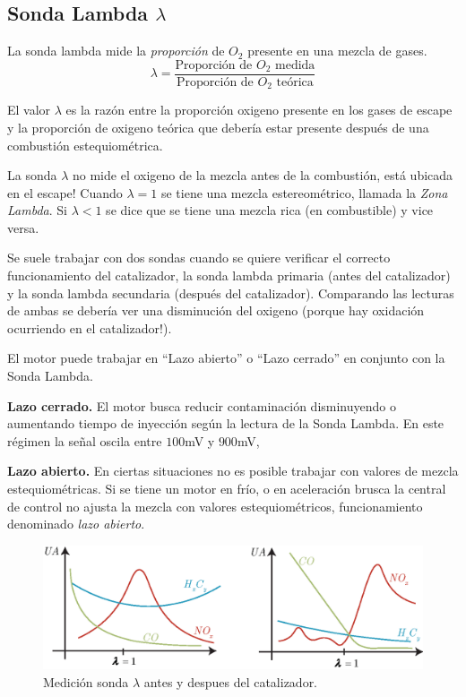 \subsection{Sonda Lambda $\lambda$}
La sonda lambda mide la \textit{proporción} de $O_2$ presente en una mezcla de gases.
\[
\lambda = \frac{\textrm{Proporción de $O_2$ medida}}{\textrm{Proporción de $O_2$ teórica}}
\]

El valor $\lambda$ es la razón entre la proporción oxigeno presente en los gases de escape y la proporción de oxigeno teórica que debería estar presente después de una combustión estequiométrica.

{\color{magenta}La sonda $\lambda$ no mide el oxigeno de la mezcla antes de la combustión, está ubicada en el escape!} Cuando $\lambda =1$ se tiene una mezcla estereométrico, llamada la \emph{Zona Lambda}. Si $\lambda<1$ se dice que se tiene una mezcla rica (en combustible) y vice versa. 

Se suele trabajar con dos sondas cuando se quiere verificar el correcto funcionamiento del catalizador, la sonda lambda primaria (antes del catalizador) y la sonda lambda secundaria (después del catalizador). Comparando las lecturas de ambas se debería ver una disminución del oxigeno (porque hay oxidación ocurriendo en el catalizador!).

El motor puede trabajar en ``Lazo abierto'' o ``Lazo cerrado'' en conjunto con la Sonda Lambda. 

{\bf Lazo cerrado.} El motor busca reducir contaminación disminuyendo o aumentando tiempo de inyección según la lectura de la Sonda Lambda. En este régimen la señal oscila entre $100$mV y $900$mV,

{\bf Lazo abierto.} En ciertas situaciones no es posible trabajar con valores de mezcla estequiométricas. Si se tiene un motor en frío, o en aceleración brusca la central de control no ajusta la mezcla con valores estequiométricos, funcionamiento denominado \emph{lazo abierto}.

\begin{figure}[!htb]
    \centering
    \includegraphics[width=.47\textwidth]{fig/lambdaEscape.eps}
    \caption{Medición sonda $\lambda$ antes y despues del catalizador. }
    \label{fig:lambdaCatalizador}
\end{figure}

